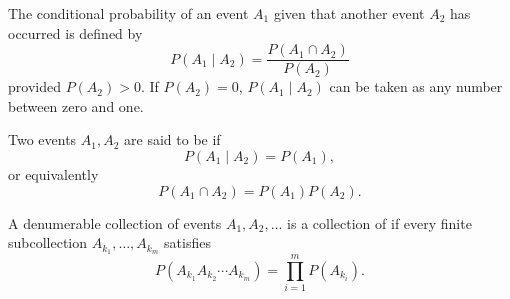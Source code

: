 The conditional probability of an event $A_1$ given that another event $A_2$ has occurred is defined by
$$P(A_1 \mid A_2) = \frac{P(A_1 \cap A_2)}{P(A_2)}$$
provided $P(A_2) > 0$. If $P(A_2) = 0$, $P(A_1 \mid A_2)$ can be taken as any number between zero and one.

Two events $A_1, A_2$ are said to be  if
$$P(A_1 \mid A_2) = P(A_1),$$
or equivalently
$$P(A_1 \cap A_2) = P(A_1) P(A_2).$$

A denumerable collection of events $A_1, A_2, \ldots$ is a collection of  if every finite subcollection $A_{k_1}, \ldots, A_{k_m}$ satisfies
$$P(A_{k_1} A_{k_2} \cdots A_{k_m}) = \prod_{i=1}^{m} P(A_{k_i}).$$
